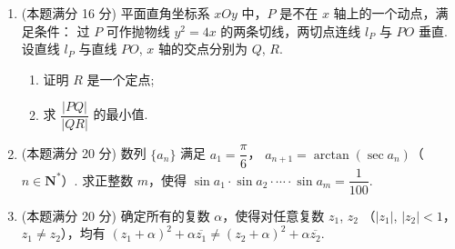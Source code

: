 \documentclass{chsmc}
\begin{document}
\begin{enumerate}[resume]
	\item (本题满分 16 分) 平面直角坐标系 $xOy$ 中，$P$ 是不在 $x$ 轴上的一个动点，满足条件：
		过 $P$ 可作抛物线 $y^2 = 4x$ 的两条切线，两切点连线 $l_P$ 与 $PO$ 垂直.
		设直线 $l_P$ 与直线 $PO$, $x$ 轴的交点分别为 $Q$, $R$.
		\begin{enumerate}[(1)]
			\item 证明 $R$ 是一个定点;
			\item 求 $\dfrac{|PQ|}{|QR|}$ 的最小值.
		\end{enumerate}
	\item (本题满分 20 分) 数列 $\{a_n\}$ 满足 $a_1 = \dfrac{\pi}{6}$，
		$a_{n+1} = \arctan(\sec a_n)$（$n \in \mathbf{N}^*$）.
		求正整数 $m$，使得 $\sin a_1\cdot\sin a_2\cdot\cdots\cdot\sin a_m = \dfrac{1}{100}$.
	\item (本题满分 20 分) 确定所有的复数 $\alpha$，使得对任意复数 $z_1$, $z_2$
		（$|z_1|$, $|z_2| < 1$，$z_1 \neq z_2$），均有
		$(z_1+\alpha)^2 + \alpha\overline{z_1} \neq (z_2+\alpha)^2 + \alpha\overline{z_2}$.
\end{enumerate}
\end{document}
